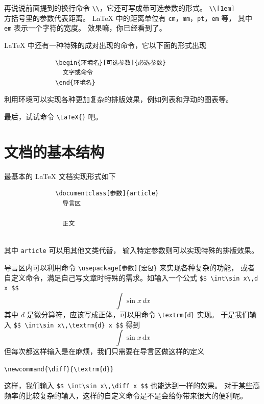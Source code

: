 再说说前面提到的换行命令 \verb|\\|，它还可写成带可选参数的形式。 \verb|\\[1em]|\\[1em]
方括号里的参数代表距离。
\LaTeX{} 中的距离单位有 \texttt{cm}，\texttt{mm}，\texttt{pt}，\texttt{em} 等，
其中 \texttt{em} 表示一个字符的宽度。
效果嘛，你已经看到了。

\LaTeX{} 中还有一种特殊的成对出现的命令，它以下面的形式出现

{\small\vspace{-0.2em}%
\begin{verbatim}
              \begin{环境名}[可选参数]{必选参数}
                文字或命令
              \end{环境名}
\end{verbatim}}

\vspace{-0.6em}\noindent
利用环境可以实现各种更加复杂的排版效果，例如列表和浮动的图表等。

最后，试试命令 \verb|\LaTeX{}| 吧。


\section{文档的基本结构}

最基本的 \LaTeX{} 文档实现形式如下

{\small\vspace{-0.2em}%
\begin{verbatim}
              \documentclass[参数]{article}
                导言区
              
                正文
              
\end{verbatim}}

\vspace{-0.6em}\noindent
其中 \texttt{article} 可以用其他文类代替，
输入特定参数则可以实现特殊的排版效果。

导言区内可以利用命令 \verb|\usepackage[参数]{宏包}| 来实现各种复杂的功能，
或者自定义命令，满足自己写文章时特殊的需求。如输入一个公式
\verb|$$ \int\sin x\,d x $$| $$ \int\sin x\,d x $$
其中 $d$ 是微分算符，应该写成正体，可以用命令 \verb|\textrm{d}| 实现。
于是我们输入 \verb|$$ \int\sin x\,\textrm{d} x $$|
得到 $$ \int\sin x\,\textrm{d} x $$
但每次都这样输入是在麻烦，我们只需要在导言区做这样的定义
\begin{center}
  \verb|\newcommand{\diff}{\textrm{d}}|
\end{center}
这样，我们输入 \verb|$$ \int\sin x\,\diff x $$| 也能达到一样的效果。
对于某些高频率的比较复杂的输入，这样的自定义命令是不是会给你带来很大的便利呢。

